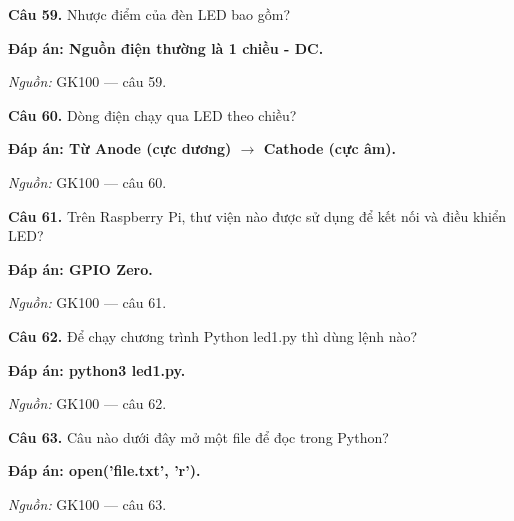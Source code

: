\documentclass[11pt,a4paper]{article}
\begin{document}
\textbf{Câu 59.} Nhược điểm của đèn LED bao gồm?\par
{\color{answer}\textbf{Đáp án: Nguồn điện thường là 1 chiều - DC.}}\par
{\footnotesize\color{sourcegray}\textit{Nguồn:} GK100 — câu 59.\par}
\vspace{3pt}\par\noindent{\color{black!18}\rule{\linewidth}{0.3pt}}\par\medskip

\textbf{Câu 60.} Dòng điện chạy qua LED theo chiều?\par
{\color{answer}\textbf{Đáp án: Từ Anode (cực dương) \ensuremath{\rightarrow} Cathode (cực âm).}}\par
{\footnotesize\color{sourcegray}\textit{Nguồn:} GK100 — câu 60.\par}
\vspace{3pt}\par\noindent{\color{black!18}\rule{\linewidth}{0.3pt}}\par\medskip

\textbf{Câu 61.} Trên Raspberry Pi, thư viện nào được sử dụng để kết nối và điều khiển LED?\par
{\color{answer}\textbf{Đáp án: GPIO Zero.}}\par
{\footnotesize\color{sourcegray}\textit{Nguồn:} GK100 — câu 61.\par}
\vspace{3pt}\par\noindent{\color{black!18}\rule{\linewidth}{0.3pt}}\par\medskip

\textbf{Câu 62.} Để chạy chương trình Python led1.py thì dùng lệnh nào?\par
{\color{answer}\textbf{Đáp án: python3 led1.py.}}\par
{\footnotesize\color{sourcegray}\textit{Nguồn:} GK100 — câu 62.\par}
\vspace{3pt}\par\noindent{\color{black!18}\rule{\linewidth}{0.3pt}}\par\medskip

\textbf{Câu 63.} Câu nào dưới đây mở một file để đọc trong Python?\par
{\color{answer}\textbf{Đáp án: open('file.txt', 'r').}}\par
{\footnotesize\color{sourcegray}\textit{Nguồn:} GK100 — câu 63.\par}
\vspace{3pt}\par\noindent{\color{black!18}\rule{\linewidth}{0.3pt}}\par\medskip
\end{document}
